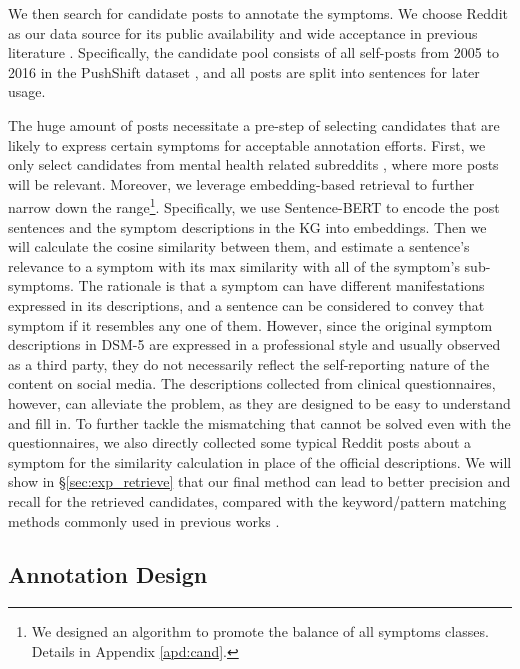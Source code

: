 We then search for candidate posts to annotate the symptoms. We choose Reddit as our data source for its public availability and wide acceptance in previous literature \citep{losada2016test,cohan2018smhd,wolohan2018detecting}. Specifically, the candidate pool consists of all self-posts from 2005 to 2016 in the PushShift dataset \citep{baumgartner2020pushshift}, and all posts are split into sentences for later usage. 

The huge amount of posts necessitate a pre-step of selecting candidates that are likely to express certain symptoms for acceptable annotation efforts. First, we only select candidates from mental health related subreddits \citep{cohan2018smhd}, where more posts will be relevant. Moreover, we leverage embedding-based retrieval to further narrow down the range\footnote{We designed an algorithm to promote the balance of all symptoms classes. Details in Appendix \ref{apd:cand}.}. Specifically, we use Sentence-BERT \citep{reimers-2019-sentence-bert} to encode the post sentences and the symptom descriptions in the KG into embeddings. Then we will calculate the cosine similarity between them, and estimate a sentence's relevance to a symptom with its max similarity with all of the symptom's sub-symptoms. The rationale is that a symptom can have different manifestations expressed in its descriptions, and a sentence can be considered to convey that symptom if it resembles any one of them. However, since the original symptom descriptions in DSM-5 are expressed in a professional style and usually observed as a third party, they do not necessarily reflect 
the self-reporting nature of the content on social media. 
The descriptions collected from clinical questionnaires, however, can alleviate the problem, as they are designed to be easy to understand and fill in. To further tackle the mismatching that cannot be solved even with the questionnaires, we also directly collected some typical Reddit posts about a symptom for the similarity calculation in place of the official descriptions. We will show in \S\ref{sec:exp_retrieve} that our final method can lead to better precision and recall for the retrieved candidates, compared with the keyword/pattern matching methods commonly used in previous works \citep{mowery2017understanding,yadav2020identifying}.

\subsection{Annotation Design}
\label{sec:data_annotation}

